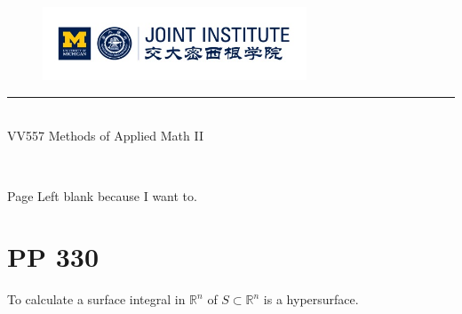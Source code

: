 \documentclass{article}
\begin{document}
\setmainfont{Cormorant Upright}
\renewcommand\arraystretch{1.5}


\thispagestyle{empty}

\begin{center}
\begin{large}
\begin{figure}[!htbp]
\centering
\includegraphics[width=0.7\textwidth]{Logo2}
\end{figure}
\hrule
\vspace*{0.25cm}
 \\
\Large  VV557 Methods of Applied Math II\\
\end{large}
\hrulefill

\vspace*{2cm}
\begin{Large}
 \\
\end{Large}
\vspace*{2cm}
\begin{Large}

\end{Large}
\vspace*{0.5cm}
\begin{large}
\end{large}
\end{center}
\newpage

\begin{center}
\vspace*{6em}
Page Left blank because I want to.
\end{center}

\newpage
\setmainfont{Optima}
\setmonofont{Optima}
\setsansfont{Optima}
\setcounter{page}{1}
\normalsize
\section{PP 330}
To calculate a surface integral in $\mathbb{R}^n$ of $S\subset \mathbb{R}^n$ is a hypersurface.
\end{document}
